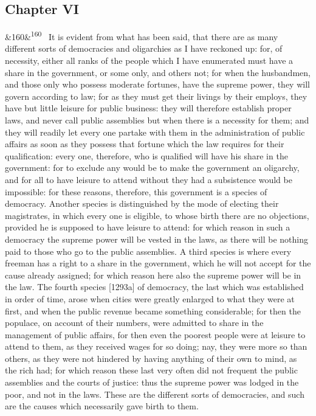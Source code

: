 \documentclass[12pt]{article}
\newcommand{\para}[1][]{\par\noindent\ifx&#1&\else\textsuperscript{\footnotesize #1}~\fi}
\begin{document}
\subsection*{Chapter VI}

\para[160] It is evident from what has been said, that there are as many different sorts of democracies and oligarchies as I have reckoned up: for, of necessity, either all ranks of the people which I have enumerated must have a share in the government, or some only, and others not; for when the husbandmen, and those only who possess moderate fortunes, have the supreme power, they will govern according to law; for as they must get their livings by their employs, they have but little leisure for public business: they will therefore establish proper laws, and never call public assemblies but when there is a necessity for them; and they will readily let every one partake with them in the administration of public affairs as soon as they possess that fortune which the law requires for their qualification: every one, therefore, who is qualified will have his share in the government: for to exclude any would be to make the government an oligarchy, and for all to have leisure to attend without they had a subsistence would be impossible: for these reasons, therefore, this government is a species of democracy. Another species is distinguished by the mode of electing their magistrates, in which every one is eligible, to whose birth there are no objections, provided he is supposed to have leisure to attend: for which reason in such a democracy the supreme power will be vested in the laws, as there will be nothing paid to those who go to the public assemblies. A third species is where every freeman has a right to a share in the government, which he will not accept for the cause already assigned; for which reason here also the supreme power will be in the law. The fourth species [1293a] of democracy, the last which was established in order of time, arose when cities were greatly enlarged to what they were at first, and when the public revenue became something considerable; for then the populace, on account of their numbers, were admitted to share in the management of public affairs, for then even the poorest people were at leisure to attend to them, as they received wages for so doing; nay, they were more so than others, as they were not hindered by having anything of their own to mind, as the rich had; for which reason these last very often did not frequent the public assemblies and the courts of justice: thus the supreme power was lodged in the poor, and not in the laws. These are the different sorts of democracies, and such are the causes which necessarily gave birth to them.
\end{document}
